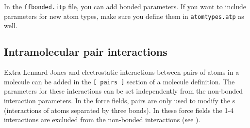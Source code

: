 



In the {\tt ffbonded.itp} file, you can add bonded parameters. If you
want to include parameters for new atom types, make sure you define
them in {\tt atomtypes.atp} as well.



\subsection{Intramolecular pair interactions}
\label{subsec:pairinteractions}
Extra Lennard-Jones and electrostatic interactions between pairs
of atoms in a molecule can be added in the {\tt [~pairs~]} section of
a molecule definition. The parameters for these interactions can
be set independently from the non-bonded interaction parameters.
In the {\gromos} force fields, pairs are only used
to modify the s (interactions of atoms
separated by three bonds). In these force fields the 1-4 interactions
are excluded from the non-bonded interactions (see ).


